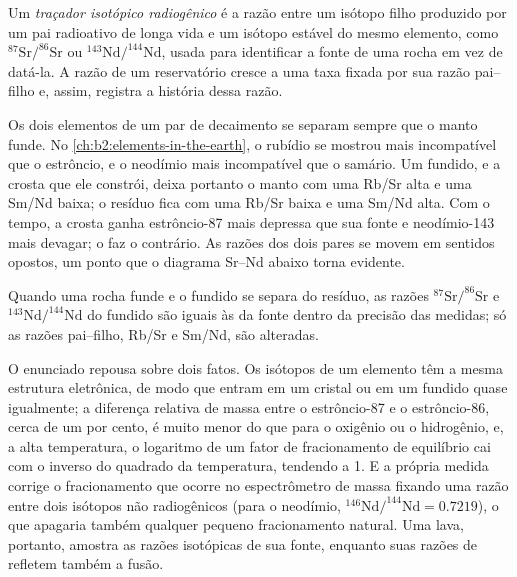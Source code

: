 \begin{definition}\label{def:b2:isotope-geochemistry:tracer}
Um \emph{traçador isotópico radiogênico} é a razão
entre um isótopo filho produzido por um pai radioativo de longa vida e um
isótopo estável do mesmo elemento, como $^{87}\mathrm{Sr}/^{86}\mathrm{Sr}$ ou
$^{143}\mathrm{Nd}/^{144}\mathrm{Nd}$, usada para identificar a fonte de uma rocha em vez
de datá-la. A razão de um reservatório cresce a uma taxa fixada por sua
razão pai--filho e, assim, registra a história dessa razão.
\end{definition}

Os dois elementos de um par de decaimento se separam sempre que o manto funde. No
\cref{ch:b2:elements-in-the-earth}, o rubídio se mostrou mais incompatível que o
estrôncio, e o neodímio mais incompatível que o samário. Um fundido, e a crosta
que ele constrói, deixa portanto o manto com uma Rb/Sr alta e uma Sm/Nd baixa; o
resíduo fica com uma Rb/Sr baixa e uma Sm/Nd alta. Com o tempo, a crosta ganha
estrôncio-87 mais depressa que sua fonte e neodímio-143 mais devagar; o  faz o contrário. As razões dos dois pares se movem em sentidos
opostos, um ponto que o diagrama Sr--Nd abaixo torna evidente.

\begin{proposition}\label{prop:b2:isotope-geochemistry:melting}
Quando uma rocha funde e o fundido se separa do resíduo, as razões
$^{87}\mathrm{Sr}/^{86}\mathrm{Sr}$ e $^{143}\mathrm{Nd}/^{144}\mathrm{Nd}$ do
fundido são iguais às da fonte dentro da precisão das
medidas; só as razões pai--filho, Rb/Sr e Sm/Nd, são alteradas.
\end{proposition}
\admitted

\noindent O enunciado repousa sobre dois fatos. Os isótopos de um elemento têm a
mesma estrutura eletrônica, de modo que entram em um cristal ou em um fundido quase igualmente; a
diferença relativa de massa entre o estrôncio-87 e o estrôncio-86, cerca de um por
cento, é muito menor do que para o oxigênio ou o hidrogênio, e, a alta temperatura, o
logaritmo de um fator de fracionamento de equilíbrio cai com o inverso do quadrado da
temperatura, tendendo a 1. E a própria medida corrige o
fracionamento que ocorre no espectrômetro de massa fixando uma razão entre dois
isótopos não radiogênicos (para o neodímio, $^{146}\mathrm{Nd}/^{144}\mathrm{Nd} =
0.7219$), o que apagaria também qualquer pequeno fracionamento natural. Uma lava,
portanto, amostra as razões isotópicas de sua fonte, enquanto suas razões de
 refletem também a fusão.

